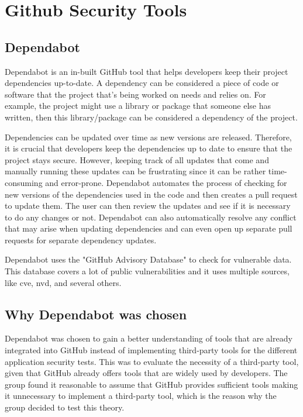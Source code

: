 \section{Github Security Tools}

\subsection{Dependabot}
Dependabot is an in-built GitHub tool that helps developers keep their project dependencies up-to-date. A dependency can be considered a piece of code or software that the project that's being worked on needs and relies on. For example, the project might use a library or package that someone else has written, then this library/package can be considered a dependency of the project. 

Dependencies can be updated over time as new versions are released. Therefore, it is crucial that developers keep the dependencies up to date to ensure that the project stays secure. However, keeping track of all updates that come and manually running these updates can be frustrating since it can be rather time-consuming and error-prone. Dependabot automates the process of checking for new versions of the dependencies used in the code and then creates a pull request to update them. The user can then review the updates and see if it is necessary to do any changes or not. 
Dependabot can also automatically resolve any conflict that may arise when updating dependencies and can even open up separate pull requests for separate dependency updates.  \cite{GithubDependabot2}

Dependabot uses the "GitHub Advisory Database" to check for vulnerable data. This database covers a lot of public vulnerabilities and it uses multiple sources, like \acrlong{cve}, \acrlong{nvd}, and several others. \cite{GithubDependabot1}

\subsection{Why Dependabot was chosen}
Dependabot was chosen to gain a better understanding of tools that are already integrated into GitHub instead of implementing third-party tools for the different application security tests. This was to evaluate the necessity of a third-party tool, given that GitHub already offers tools that are widely used by developers. The group found it reasonable to assume that GitHub provides sufficient tools making it unnecessary to implement a third-party tool, which is the reason why the group decided to test this theory. 
